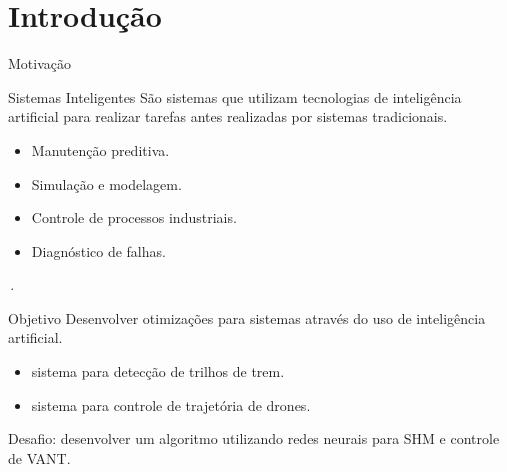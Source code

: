 \section{Introdução}
\begin{frame}{Motivação}
\begin{block}{Sistemas Inteligentes}
    São sistemas que utilizam tecnologias de inteligência artificial para realizar tarefas antes realizadas por sistemas tradicionais.    
\end{block}
\begin{itemize}
    \item Manutenção preditiva.
    \item Simulação e modelagem.
    \item Controle de processos industriais.
    \item Diagnóstico de falhas.
\end{itemize} \pause
\vfill
\lefthand\,.
\end{frame}
\begin{frame}{Objetivo}
Desenvolver otimizações para sistemas através do uso de inteligência artificial. \pause
\begin{itemize}
    \item {} sistema para detecção de trilhos de trem. 
    \item {} sistema para controle de trajetória de drones.
\end{itemize} \pause
\alert{Desafio:} desenvolver um algoritmo utilizando redes neurais para SHM e controle de VANT.
\end{frame}



